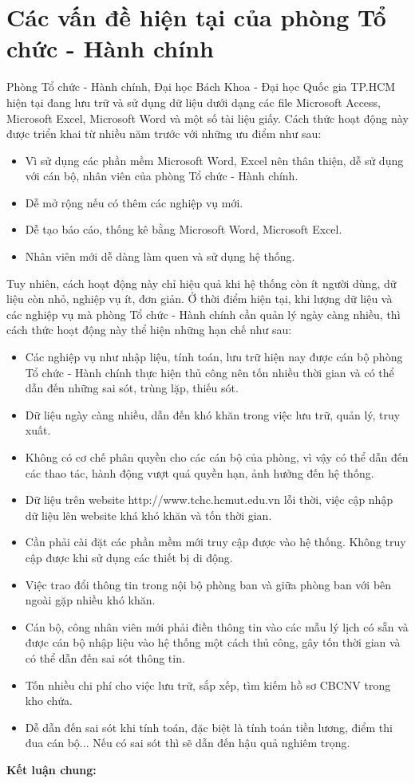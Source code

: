 \section{Các vấn đề hiện tại của phòng Tổ chức - Hành chính}
Phòng Tổ chức - Hành chính, Đại học Bách Khoa - Đại học Quốc gia TP.HCM hiện tại đang lưu trữ và sử dụng dữ liệu dưới dạng các file Microsoft Access, Microsoft Excel, Microsoft Word và một số tài liệu giấy. Cách thức hoạt động này được triển khai từ nhiều năm trước với những ưu điểm như sau:
\begin{itemize}
    \item Vì sử dụng các phần mềm Microsoft Word, Excel nên thân thiện, dễ sử dụng với cán bộ, nhân viên của phòng Tổ chức - Hành chính.
    \item Dễ mở rộng nếu có thêm các nghiệp vụ mới.
    \item Dễ tạo báo cáo, thống kê bằng Microsoft Word, Microsoft Excel.
    \item Nhân viên mới dễ dàng làm quen và sử dụng hệ thống.
\end{itemize}

Tuy nhiên, cách hoạt động này chỉ hiệu quả khi hệ thống còn ít người dùng, dữ liệu còn nhỏ, nghiệp vụ ít, đơn giản. Ở thời điểm hiện tại, khi lượng dữ liệu và các nghiệp vụ mà phòng Tổ chức - Hành chính cần quản lý ngày càng nhiều, thì cách thức hoạt động này thể hiện những hạn chế như sau: 
\begin{itemize}
    \item Các nghiệp vụ như nhập liệu, tính toán, lưu trữ hiện nay được cán bộ phòng Tổ chức - Hành chính thực hiện thủ công nên tốn nhiều thời gian và có thể dẫn đến những sai sót, trùng lặp, thiếu sót.
    \item Dữ liệu ngày càng nhiều, dẫn đến khó khăn trong việc lưu trữ, quản lý, truy xuất.
    \item Không có cơ chế phân quyền cho các cán bộ của phòng, vì vậy có thể dẫn đến các thao tác, hành động vượt quá quyền hạn, ảnh hưởng đến hệ thống. 
    \item Dữ liệu trên website http://www.tchc.hcmut.edu.vn lỗi thời, việc cập nhập dữ liệu lên website khá khó khăn và tốn thời gian.
    \item Cần phải cài đặt các phần mềm mới truy cập được vào hệ thống. Không truy cập được khi sử dụng các thiết bị di động.
    \item Việc trao đổi thông tin trong nội bộ phòng ban và giữa phòng ban với bên ngoài gặp nhiều khó khăn.
    \item Cán bộ, công nhân viên mới phải điền thông tin vào các mẫu lý lịch có sẵn và được cán bộ nhập liệu vào hệ thống một cách thủ công, gây tốn thời gian và có thể dẫn đến sai sót thông tin.
    \item Tốn nhiều chi phí cho việc lưu trữ, sắp xếp, tìm kiếm hồ sơ CBCNV trong kho chứa.
    \item Dễ dẫn đến sai sót khi tính toán, đặc biệt là tính toán tiền lương, điểm thi đua cán bộ... Nếu có sai sót thì sẽ dẫn đến hậu quả nghiêm trọng.
\end{itemize}
\textbf{Kết luận chung:}

